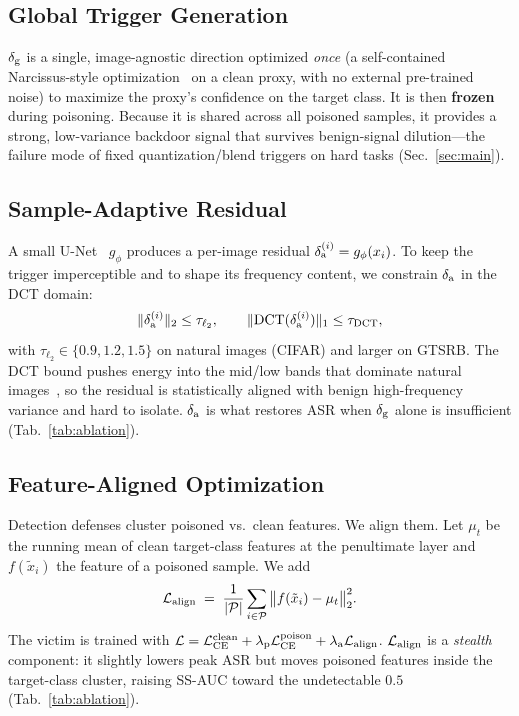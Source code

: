 \subsection{Global Trigger Generation}
\label{sec:global}
$\delta_{\mathrm{g}}$ is a single, image-agnostic direction optimized \emph{once} (a
self-contained Narcissus-style optimization~\cite{zeng2023narcissus} on a clean
proxy, with no external pre-trained noise) to maximize the proxy's confidence on
the target class. It is then \textbf{frozen} during poisoning. Because it is
shared across all poisoned samples, it provides a strong, low-variance backdoor
signal that survives benign-signal dilution---the failure mode of fixed
quantization/blend triggers on hard tasks (Sec.~\ref{sec:main}).

\subsection{Sample-Adaptive Residual}
\label{sec:adapt}
A small U-Net~\cite{ronneberger2015unet} $g_\phi$ produces a per-image residual
$\delta_{\mathrm{a}}^{(i)} = g_\phi(x_i)$. To keep the trigger imperceptible and to shape its
frequency content, we constrain $\delta_{\mathrm{a}}$ in the DCT domain:
\begin{equation}
\|\delta_{\mathrm{a}}^{(i)}\|_2 \le \tau_{\ell_2}, \qquad
\|\mathrm{DCT}(\delta_{\mathrm{a}}^{(i)})\|_1 \le \tau_{\mathrm{DCT}},
\label{eq:bound}
\end{equation}
with $\tau_{\ell_2}\!\in\!\{0.9,1.2,1.5\}$ on natural images (CIFAR) and larger
on GTSRB. The DCT bound pushes energy into the mid/low bands that dominate
natural images~\cite{lo2013dct}, so the residual is statistically aligned with
benign high-frequency variance and hard to isolate. $\delta_{\mathrm{a}}$ is what restores
ASR when $\delta_{\mathrm{g}}$ alone is insufficient (Tab.~\ref{tab:ablation}).

\subsection{Feature-Aligned Optimization}
\label{sec:align}
Detection defenses cluster poisoned vs.\ clean features. We align them. Let
$\mu_t$ be the running mean of clean target-class features at the penultimate
layer and $f(\tilde{x}_i)$ the feature of a poisoned sample. We add
\begin{equation}
\mathcal{L}_{\mathrm{align}} \;=\; \frac{1}{|\mathcal{P}|}\sum_{i\in\mathcal{P}}
\big\| f(\tilde{x}_i) - \mu_t \big\|_2^2 .
\label{eq:align}
\end{equation}
The victim is trained with $\mathcal{L} = \mathcal{L}_{\mathrm{CE}}^{\mathrm{clean}}
+ \lambda_{\mathrm{p}}\mathcal{L}_{\mathrm{CE}}^{\mathrm{poison}} + \lambda_{\mathrm{a}}\mathcal{L}_{\mathrm{align}}$.
$\mathcal{L}_{\mathrm{align}}$ is a \emph{stealth} component: it slightly lowers peak ASR but moves
poisoned features inside the target-class cluster, raising SS-AUC toward the
undetectable $0.5$ (Tab.~\ref{tab:ablation}).

